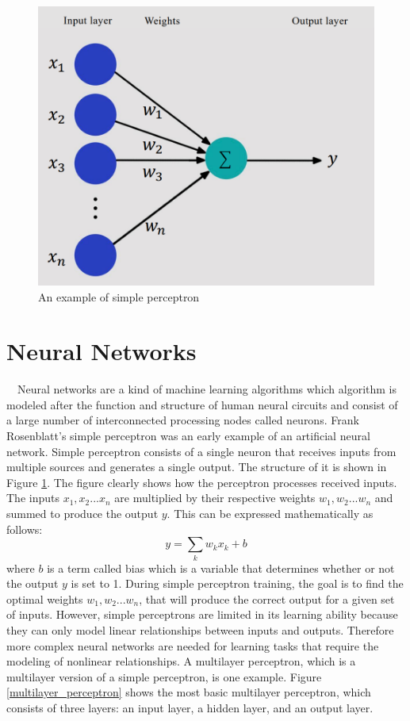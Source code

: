 \begin{figure}[h]
  \centering
  \includegraphics[width=120truemm]{resources/2_background/simple_perceptron.png}
  \caption{
    An example of simple perceptron
  }
  \label{simple_perceptron}
\end{figure}

\section{Neural Networks}
　Neural networks are a kind of machine learning algorithms which 
algorithm is modeled after the function and structure of human 
neural circuits and consist of a large number of interconnected 
processing nodes called neurons.
Frank Rosenblatt's simple perceptron \cite{Rosenblatt1958ThePA} was 
an early example of an artificial neural network. 
Simple perceptron consists of a single neuron that receives inputs 
from multiple sources and generates a single output. 
The structure of it is shown in Figure \ref{simple_perceptron}. 
The figure clearly shows how the perceptron processes received inputs.
The inputs $x_1, x_2 ... x_n$ are multiplied by their respective weights
$w_1, w_2 ... w_n$ and summed to produce the output $y$.
This can be expressed mathematically as follows:
\begin{equation}
  \label{perceptron_output}
  y = \sum_{k}w_k x_k + b
\end{equation}
where $b$ is a term called bias which is a variable that determines 
whether or not the output $y$ is set to 1.
During simple perceptron training, the goal is to find the optimal 
weights $w_1, w_2 ... w_n$, that will produce the correct output for 
a given set of inputs.
However, simple perceptrons are limited in its learning ability because 
they can only model linear relationships between inputs and outputs.
Therefore more complex neural networks are needed for learning tasks 
that require the modeling of nonlinear relationships.
A multilayer perceptron, which is a multilayer version of a simple 
perceptron, is one example. Figure \ref{multilayer_perceptron} shows
the most basic multilayer perceptron, which consists of three layers: 
an input layer, a hidden layer, and an output layer.

